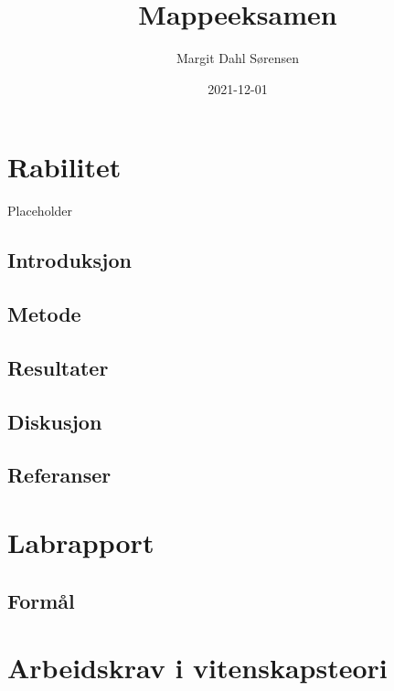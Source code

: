 \documentclass[
]{book}
\title{Mappeeksamen}
\author{Margit Dahl Sørensen}
\date{2021-12-01}
\begin{document}
\maketitle

{
\setcounter{tocdepth}{1}
\tableofcontents
}
\hypertarget{rabilitet}{%
\chapter{Rabilitet}\label{rabilitet}}

Placeholder

\hypertarget{introduksjon}{%
\section{Introduksjon}\label{introduksjon}}

\hypertarget{metode}{%
\section{Metode}\label{metode}}

\hypertarget{resultater}{%
\section{Resultater}\label{resultater}}

\hypertarget{diskusjon}{%
\section{Diskusjon}\label{diskusjon}}

\hypertarget{referanser}{%
\section{Referanser}\label{referanser}}

\hypertarget{labrapport}{%
\chapter{Labrapport}\label{labrapport}}

\hypertarget{formuxe5l}{%
\section{Formål}\label{formuxe5l}}

\hypertarget{arbeidskrav-i-vitenskapsteori}{%
\chapter{Arbeidskrav i vitenskapsteori}\label{arbeidskrav-i-vitenskapsteori}}
\end{document}
